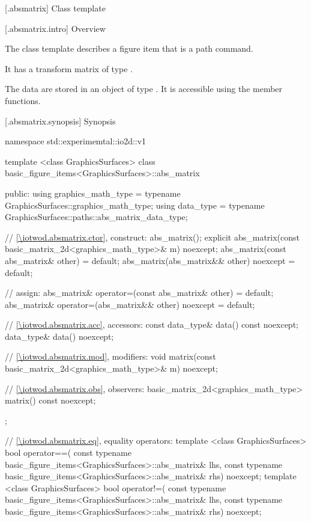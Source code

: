  [\iotwod.absmatrix] {Class template }

 [\iotwod.absmatrix.intro] {Overview}

\pnum
{}%
The class template  describes a figure item that is a path command.

\pnum
It has a transform matrix of type .

\pnum
The data are stored in an object of type . It is accessible using the  member functions.

 [\iotwod.absmatrix.synopsis] {Synopsis}
\begin{codeblock}
namespace std::experimemtal::io2d::v1 {
  template <class GraphicsSurfaces>
  class basic_figure_items<GraphicsSurfaces>::abs_matrix {
  public:
    using graphics_math_type = typename GraphicsSurfaces::graphics_math_type;
    using data_type =
      typename GraphicsSurfaces::paths::abs_matrix_data_type;

    // \ref{\iotwod.absmatrix.ctor}, construct:
    abs_matrix();
    explicit abs_matrix(const basic_matrix_2d<graphics_math_type>& m) noexcept;
    abs_matrix(const abs_matrix& other) = default;
    abs_matrix(abs_matrix&& other) noexcept = default;

    // assign:
    abs_matrix& operator=(const abs_matrix& other) = default;
    abs_matrix& operator=(abs_matrix&& other) noexcept = default;

    // \ref{\iotwod.absmatrix.acc}, accessors:
    const data_type& data() const noexcept;
    data_type& data() noexcept;

    // \ref{\iotwod.absmatrix.mod}, modifiers:
    void matrix(const basic_matrix_2d<graphics_math_type>& m) noexcept;

    // \ref{\iotwod.absmatrix.obs}, observers:
    basic_matrix_2d<graphics_math_type> matrix() const noexcept;
  };
  
  // \ref{\iotwod.absmatrix.eq}, equality operators:
  template <class GraphicsSurfaces>
  bool operator==(
    const typename basic_figure_items<GraphicsSurfaces>::abs_matrix& lhs,
    const typename basic_figure_items<GraphicsSurfaces>::abs_matrix& rhs) 
    noexcept;  
  template <class GraphicsSurfaces>
  bool operator!=(
    const typename basic_figure_items<GraphicsSurfaces>::abs_matrix& lhs,
    const typename basic_figure_items<GraphicsSurfaces>::abs_matrix& rhs) 
    noexcept;  
}
\end{codeblock}

